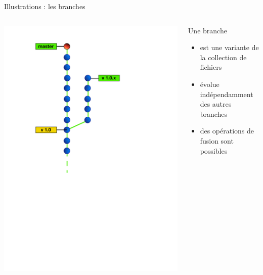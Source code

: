 \begin{frame}[fragile]{%
\protect\hypertarget{illustrations-les-branches}{%
Illustrations : les branches}}

\begin{columns}[T]
\begin{column}{0.40\textwidth}
\includegraphics[height=1.5\textwidth]{images/branches.pdf}
\end{column}

\begin{column}{0.60\textwidth}
Une branche

\begin{itemize}
\tightlist
\item
  est une variante de la collection de fichiers
\item
  évolue indépendamment des autres branches
\item
  des opérations de fusion sont possibles
\end{itemize}


\end{column}
\end{columns}
\end{frame}

